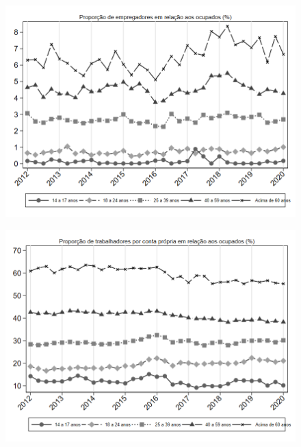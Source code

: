 \begin{frame}[label=_composicao_demografica_faixa_etaria_prop_empregador]{}
\textit{\hyperlink{_composicao_demografica_faixa_etaria}{}}
\begin{figure}
  \centering
  \includegraphics[width=1.0\linewidth]{../../analysis/output/composicao_demografica/faixa_etaria/_composicao_demografica_faixa_etaria_prop_empregador.png}
  \caption{}
  \label{fig:_composicao_demografica_faixa_etaria_prop_empregador}
\end{figure}
\end{frame}



\begin{frame}[label=_composicao_demografica_faixa_etaria_prop_cpropria]{}
\textit{\hyperlink{_composicao_demografica_faixa_etaria}{}}
\begin{figure}
  \centering
  \includegraphics[width=1.0\linewidth]{../../analysis/output/composicao_demografica/faixa_etaria/_composicao_demografica_faixa_etaria_prop_cpropria.png}
  \caption{}
  \label{fig:_composicao_demografica_faixa_etaria_prop_cpropria}
\end{figure}
\end{frame}

